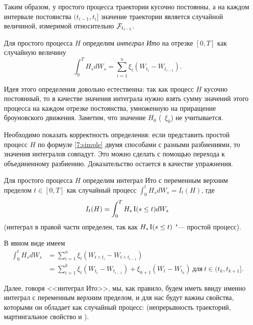 Таким образом, у простого процесса траектории кусочно постоянны, а на каждом интервале постоянства $(t_{i-1},t_i]$ значение траектории является случайной величиной, измеримой относительно $\mathcal{F}_{t_{i-1}}$.

\begin{definition}
Для простого процесса $H$ определим \emph{интеграл Ито} на отрезке $[0,T]$ как случайную величину
\begin{equation}
\int_0^T H_s d W_s 
= \sum_{i=1}^n \xi_i (W_{t_i} - W_{t_{i-1}}).
\end{equation}
\end{definition}

Идея этого определения довольно естественна: так как процесс $H$ кусочно постоянный, то в качестве значения интеграла нужно взять сумму значений этого процесса на каждом отрезке постоянства, умноженную на приращение броуновского движения.
Заметим, что значение $H_0$ (\te\ $\xi_0$) не учитывается. 

Необходимо показать корректность определения: если представить простой процесс $H$ по формуле \eqref{7:simple} двумя способами с разными разбиениями, то значения интегралов совпадут.
Это можно сделать с помощью перехода к объединенному разбиению.
Доказательство остается в качестве упражнения.

\begin{definition}
Для простого процесса $H$ определим интеграл Ито с переменным верхним пределом $t\in[0,T]$ как случайный процесс $\int_0^t H_s d W_s = I_t(H)$, где
\begin{equation}
I_t(H) = \int_0^T H_s \operatorname{I}(s\le t) d W_s
\end{equation}
(интеграл в правой части определен, так как  $H_s\operatorname{I}(s\le t)$ "--- простой процесс).

В явном виде имеем
\begin{equation}
\label{7:simple-integral}
\begin{aligned}
\int_0^t H_s d W_s &= \sum_{i=1}^n \xi_i (W_{t\wedge t_i} - W_{t\wedge t_{i-1}}) \\
& = \sum_{i=1}^k \xi_i (W_{t_i} - W_{t_{i-1}}) + \xi_{k+1} (W_t - W_{t_k})\ \text{для}\ t\in(t_k,t_{k+1}].
\end{aligned}
\end{equation}
\end{definition}

Далее, говоря <<интеграл Ито>>, мы, как правило, будем иметь ввиду именно интеграл с переменным верхним пределом, и для нас будут важны свойства, которыми он обладает как случайный процесс: (непрерывность траекторий, мартингальное свойство и \td).

